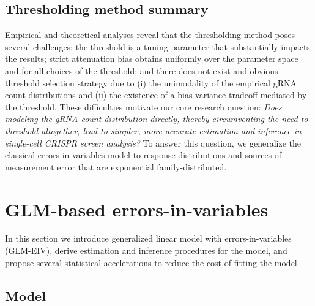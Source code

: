 \documentclass[12pt]{article}
\begin{document}
\subsection{Thresholding method summary}

Empirical and theoretical analyses reveal that the thresholding method poses several challenges: the threshold is a tuning parameter that substantially impacts the results; strict attenuation bias obtains uniformly over the parameter space and for all choices of the threshold; and there does not exist and obvious threshold selection strategy due to (i) the unimodality of the empirical gRNA count distributions and (ii) the existence of a bias-variance tradeoff mediated by the threshold. These difficulties motivate our core research question: \textit{Does modeling the gRNA count distribution directly, thereby circumventing the need to threshold altogether, lead to simpler, more accurate estimation and inference in single-cell CRISPR screen analysis?} To answer this question, we generalize the classical errors-in-variables model to response distributions and sources of measurement error that are exponential family-distributed.

\section{GLM-based errors-in-variables}

In this section we introduce generalized linear model with errors-in-variables (GLM-EIV), derive estimation and inference procedures for the model, and propose several statistical accelerations to reduce the cost of fitting the model.

\subsection{Model}\label{sec:model}
\end{document}
